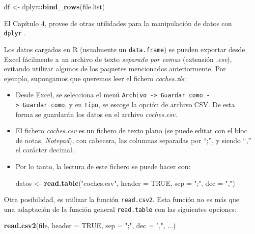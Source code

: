 \documentclass[
]{book}
\newenvironment{Shaded}{\begin{snugshade}}{\end{snugshade}}
\newcommand{\AttributeTok}[1]{\textcolor[rgb]{0.13,0.29,0.53}{#1}}
\newcommand{\ConstantTok}[1]{\textcolor[rgb]{0.56,0.35,0.01}{#1}}
\newcommand{\FunctionTok}[1]{\textcolor[rgb]{0.13,0.29,0.53}{\textbf{#1}}}
\newcommand{\NormalTok}[1]{#1}
\newcommand{\OtherTok}[1]{\textcolor[rgb]{0.56,0.35,0.01}{#1}}
\newcommand{\SpecialCharTok}[1]{\textcolor[rgb]{0.81,0.36,0.00}{\textbf{#1}}}
\newcommand{\StringTok}[1]{\textcolor[rgb]{0.31,0.60,0.02}{#1}}
\begin{document}
\begin{Shaded}
\begin{Highlighting}[]
\NormalTok{df }\OtherTok{\textless{}{-}}\NormalTok{ dplyr}\SpecialCharTok{::}\FunctionTok{bind\_rows}\NormalTok{(file.list)}
\end{Highlighting}
\end{Shaded}

El Capítulo 4, provee de otras utilidades para la manipulación de datos con \texttt{dplyr} \citep{R-dplyr}.

Los datos cargados en R (usualmente un \texttt{data.frame}) se pueden exportar desde Excel fácilmente a un archivo de texto \emph{separado por comas} (extensión \emph{.csv}), evitando utilizar algunos de los paquetes mencionados anteriormente.
Por ejemplo, supongamos que queremos leer el fichero \emph{coches.xls}:

\begin{itemize}
\item
  Desde Excel, se selecciona el menú \texttt{Archivo\ -\textgreater{}\ Guardar\ como\ -\textgreater{}\ Guardar\ como}, y en \texttt{Tipo}, se escoge la opción de archivo CSV. De esta forma se guardarán los datos en el archivo \emph{coches.csv}.
\item
  El fichero \emph{coches.csv} es un fichero de texto plano (se puede
  editar con el bloc de notas, \emph{Notepad}), con cabecera, las columnas separadas por ``;'', y siendo ``,'' el carácter decimal.
\item
  Por lo tanto, la lectura de este fichero se puede hacer con:

\begin{Shaded}
\begin{Highlighting}[]
\NormalTok{datos }\OtherTok{\textless{}{-}} \FunctionTok{read.table}\NormalTok{(}\StringTok{"coches.csv"}\NormalTok{, }\AttributeTok{header =} \ConstantTok{TRUE}\NormalTok{, }
                    \AttributeTok{sep =} \StringTok{";"}\NormalTok{, }\AttributeTok{dec =} \StringTok{","}\NormalTok{)}
\end{Highlighting}
\end{Shaded}
\end{itemize}

Otra posibilidad, es utilizar la función \texttt{read.csv2}. Esta función no es más que una adaptación de la función general \texttt{read.table} con las siguientes
opciones:

\begin{Shaded}
\begin{Highlighting}[]
\FunctionTok{read.csv2}\NormalTok{(file, }\AttributeTok{header =} \ConstantTok{TRUE}\NormalTok{, }\AttributeTok{sep =} \StringTok{";"}\NormalTok{, }\AttributeTok{dec =} \StringTok{","}\NormalTok{, ...)}
\end{Highlighting}
\end{Shaded}
\end{document}
